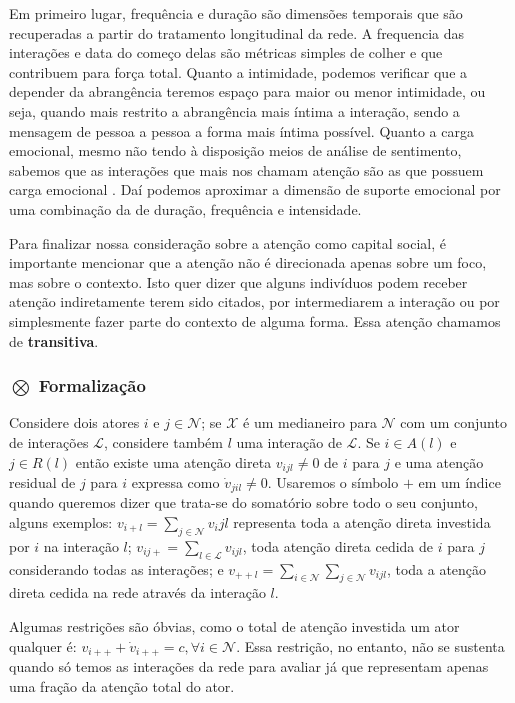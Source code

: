 \documentclass{article}
\begin{document}
Em primeiro lugar, frequência e duração são dimensões temporais que são
recuperadas a partir do tratamento longitudinal da rede. A frequencia das
interações e data do começo delas são métricas simples de colher e que contribuem
para força total. Quanto a intimidade, podemos verificar que a depender da
abrangência teremos espaço para maior ou menor intimidade, ou seja, quando mais
restrito a abrangência mais íntima a interação, sendo a mensagem de pessoa a
pessoa a forma mais íntima possível. Quanto a carga emocional, mesmo não tendo à
disposição meios de análise de sentimento, sabemos que as interações que mais nos
chamam atenção são as que possuem carga emocional \cite{Davenport2001}. Daí
podemos aproximar a dimensão de suporte emocional por uma combinação da de
duração, frequência e intensidade.

Para finalizar nossa consideração sobre a atenção como capital social, é
importante mencionar que a atenção não é direcionada apenas sobre um foco, mas
sobre o contexto. Isto quer dizer que alguns indivíduos podem receber atenção
indiretamente terem sido citados, por intermediarem a interação ou por
simplesmente fazer parte do contexto de alguma forma. Essa atenção chamamos de
\textbf{transitiva}.

\subsubsection{$\bigotimes$ Formalização}

Considere dois atores $i$ e $j \in \mathscr{N}$; se $\mathscr{X}$ é um medianeiro
para $\mathscr{N}$ com um conjunto de interações $\mathscr{L}$, considere também
$l$ uma interação de $\mathscr{L}$. Se $i \in A(l)$ e $j \in R(l)$ então existe
uma atenção direta $v_{ijl}\neq0$ de $i$ para $j$ e uma atenção residual de $j$
para $i$ expressa como $\dot{v}_{jil}\neq0$. Usaremos o símbolo $+$ em um índice
quando queremos dizer que trata-se do somatório sobre todo o seu conjunto, alguns
exemplos: $v_{i+l} = \sum_{j \in \mathscr{N}}v_ijl$ representa toda a atenção
direta investida por $i$ na interação $l$; $v_{ij+} = \sum_{l \in
\mathscr{L}}v_{ijl}$, toda atenção direta cedida de $i$ para $j$ considerando
todas as interações; e $v_{++l} = \sum_{i \in \mathscr{N}}\sum_{j \in
\mathscr{N}}v_{ijl}$, toda a atenção direta cedida na rede através da interação
$l$.

Algumas restrições são óbvias, como o total de atenção investida um ator qualquer
é: $v_{i++} + \dot{v}_{i++} = c, \forall i \in \mathscr{N}$. Essa restrição, no
entanto, não se sustenta quando só temos as interações da rede para avaliar já
que representam apenas uma fração da atenção total do ator.
\end{document}

